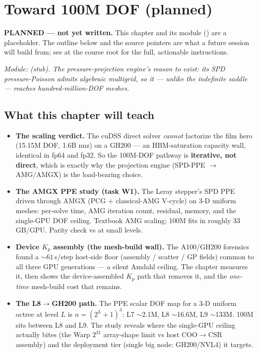 \chapter{Toward 100M DOF (planned)}
\label{ch:c6}

\begin{keybox}\textbf{PLANNED --- not yet written.} This chapter and its
module () are a placeholder. The outline below
and the source pointers are what a future session will build from; see
 at the course root for the full, actionable
instructions.\end{keybox}

\emph{Module:  (stub). The pressure-projection
engine's reason to exist: its SPD pressure-Poisson admits algebraic
multigrid, so it --- unlike the indefinite saddle --- reaches
hundred-million-DOF meshes.}

\section*{What this chapter will teach}
\begin{itemize}
\item \textbf{The scaling verdict.} The cuDSS direct solver \emph{cannot}
  factorize the film hero (15.15M DOF, 1.6B nnz) on a GH200 --- an
  HBM-saturation capacity wall, identical in fp64 and fp32. So the
  100M-DOF pathway is \textbf{iterative, not direct}, which is exactly why
  the projection engine (SPD-PPE $\to$ AMG/AMGX) is the load-bearing choice.
\item \textbf{The AMGX PPE study (task W1).} The Leray stepper's SPD PPE
  driven through AMGX (PCG $+$ classical-AMG V-cycle) on 3-D uniform meshes:
  per-solve time, AMG iteration count, residual, memory, and the
  single-GPU DOF ceiling. Textbook AMG scaling; 100M fits in roughly
  33\,GB/GPU. Parity check vs  at small levels.
\item \textbf{Device $K_p$ assembly (the mesh-build wall).} The A100/GH200
  forensics found a ${\sim}61$\,s/step host-side floor (assembly / scatter /
  GP fields) common to all three GPU generations --- a silent Amdahl
  ceiling. The chapter measures it, then shows the device-assembled $K_p$
  path that removes it, and the \emph{one-time} mesh-build cost that
  remains.
\item \textbf{The L8$\to$GH200 path.} The PPE scalar DOF map for a 3-D
  uniform octree at level $L$ is $n=(2^L+1)^3$: L7 ${\sim}$2.1M,
  L8 ${\sim}$16.6M, L9 ${\sim}$133M. 100M sits between L8 and L9. The
  study reveals where the single-GPU ceiling actually bites (the Warp
  $2^{31}$ array-shape limit vs host COO$\to$CSR assembly) and the
  deployment tier (single big node: GH200/NVL4) it targets.
\end{itemize}

